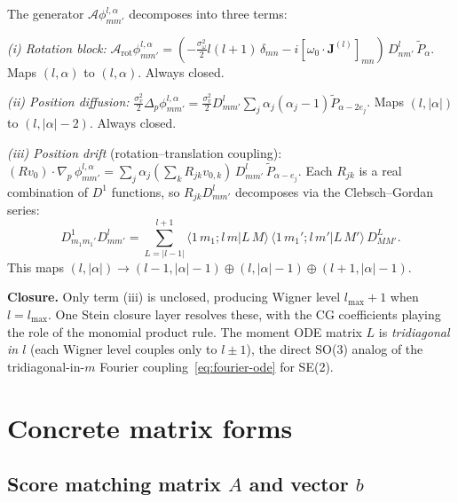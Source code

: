 \documentclass{article}
\theoremstyle{definition}
\begin{document}
The generator $\mathcal{A}\phi^{l,\alpha}_{mm'}$ decomposes into three terms:

\emph{(i) Rotation block:}
$\mathcal{A}_{\mathrm{rot}} \phi^{l,\alpha}_{mm'}
= (-\frac{\sigma_\omega^2}{2}l(l{+}1)\,\delta_{mn}
- i[\omega_0 {\cdot} \mathbf{J}^{(l)}]_{mn})\,
D^l_{nm'}\,\widetilde{P}_\alpha$.
Maps $(l, \alpha)$ to $(l, \alpha)$.  Always closed.

\emph{(ii) Position diffusion:}
$\frac{\sigma_v^2}{2}\Delta_p \phi^{l,\alpha}_{mm'}
= \frac{\sigma_v^2}{2}D^l_{mm'}\sum_j \alpha_j(\alpha_j{-}1)\widetilde{P}_{\alpha-2e_j}$.
Maps $(l, |\alpha|)$ to $(l, |\alpha|{-}2)$.  Always closed.

\emph{(iii) Position drift} (rotation--translation coupling):
$(Rv_0) \cdot \nabla_p\,\phi^{l,\alpha}_{mm'}
= \sum_j \alpha_j (\sum_k R_{jk} v_{0,k})\,
D^l_{mm'}\,\widetilde{P}_{\alpha-e_j}$.
Each $R_{jk}$ is a real combination of $D^1$ functions, so
$R_{jk} D^l_{mm'}$ decomposes via the Clebsch--Gordan series:
\begin{equation}\label{eq:se3-cg}
    D^1_{m_1 m_1'} D^l_{mm'}
    = \sum_{L=|l-1|}^{l+1}
    \langle 1\,m_1; l\,m | L\,M\rangle\,
    \langle 1\,m_1'; l\,m' | L\,M'\rangle\,
    D^L_{MM'}.
\end{equation}
This maps $(l, |\alpha|) \to (l{-}1, |\alpha|{-}1) \oplus (l, |\alpha|{-}1) \oplus (l{+}1, |\alpha|{-}1)$.

\textbf{Closure.} Only term (iii) is unclosed, producing Wigner level
$l_{\max}{+}1$ when $l = l_{\max}$.
One Stein closure layer resolves these, with the CG coefficients
playing the role of the monomial product rule.
The moment ODE matrix $L$ is \emph{tridiagonal in $l$}
(each Wigner level couples only to $l \pm 1$),
the direct SO(3) analog of the tridiagonal-in-$m$ Fourier
coupling~\eqref{eq:fourier-ode} for SE(2).

\section{Concrete matrix forms}
\label{app:matrices}

\subsection{Score matching matrix \texorpdfstring{$A$}{A} and vector \texorpdfstring{$b$}{b}}
\end{document}
